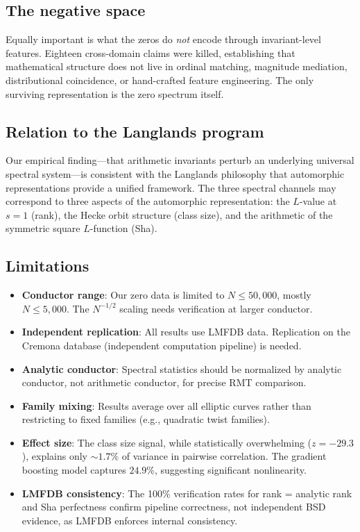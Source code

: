 \documentclass[11pt,a4paper]{article}
\begin{document}
\subsection{The negative space}

Equally important is what the zeros do \emph{not} encode through invariant-level features. Eighteen cross-domain claims were killed, establishing that mathematical structure does not live in ordinal matching, magnitude mediation, distributional coincidence, or hand-crafted feature engineering. The only surviving representation is the zero spectrum itself.

\subsection{Relation to the Langlands program}

Our empirical finding---that arithmetic invariants perturb an underlying universal spectral system---is consistent with the Langlands philosophy that automorphic representations provide a unified framework. The three spectral channels may correspond to three aspects of the automorphic representation: the $L$-value at $s = 1$ (rank), the Hecke orbit structure (class size), and the arithmetic of the symmetric square $L$-function (Sha).

\subsection{Limitations}

\begin{itemize}[nosep]
  \item \textbf{Conductor range}: Our zero data is limited to $N \leq 50{,}000$, mostly $N \leq 5{,}000$. The $N^{-1/2}$ scaling needs verification at larger conductor.
  \item \textbf{Independent replication}: All results use LMFDB data. Replication on the Cremona database (independent computation pipeline) is needed.
  \item \textbf{Analytic conductor}: Spectral statistics should be normalized by analytic conductor, not arithmetic conductor, for precise RMT comparison.
  \item \textbf{Family mixing}: Results average over all elliptic curves rather than restricting to fixed families (e.g., quadratic twist families).
  \item \textbf{Effect size}: The class size signal, while statistically overwhelming ($z = -29.3$), explains only ${\sim}1.7\%$ of variance in pairwise correlation. The gradient boosting model captures $24.9\%$, suggesting significant nonlinearity.
  \item \textbf{LMFDB consistency}: The 100\% verification rates for rank = analytic rank and Sha perfectness confirm pipeline correctness, not independent BSD evidence, as LMFDB enforces internal consistency.
\end{itemize}
\end{document}
